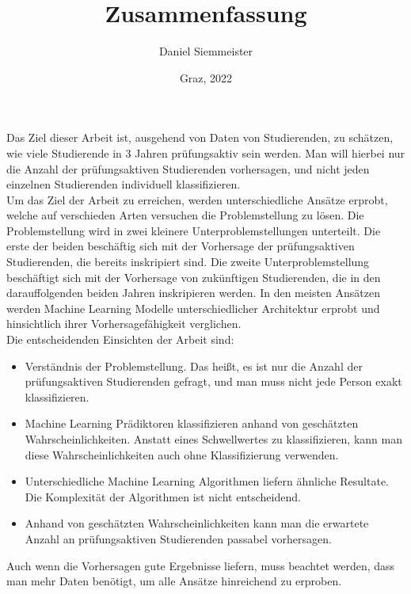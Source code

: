 \documentclass[a4paper, german, 11pt]{article}
\title{Zusammenfassung}
\author{Daniel Siemmeister}
\date{Graz, 2022}
\begin{document}
\maketitle
\thispagestyle{empty}

Das Ziel dieser Arbeit ist, ausgehend von Daten von Studierenden, zu sch\"atzen, wie viele
Studierende in 3 Jahren pr\"ufungsaktiv sein werden. Man will hierbei nur die Anzahl der pr\"ufungsaktiven Studierenden vorhersagen,
und nicht jeden einzelnen Studierenden individuell klassifizieren. \\

Um das Ziel der Arbeit zu erreichen, werden unterschiedliche Ans\"atze erprobt, welche auf verschieden Arten versuchen die Problemstellung zu l\"osen.
Die Problemstellung wird in zwei kleinere Unterproblemstellungen unterteilt. Die erste der beiden besch\"aftig sich mit der Vorhersage der pr\"ufungsaktiven Studierenden,
die bereits inskripiert sind. Die zweite Unterproblemstellung besch\"aftigt sich mit der Vorhersage von zuk\"unftigen Studierenden, die in den darauffolgenden beiden Jahren inskripieren werden.
In den meisten Ans\"atzen werden Machine Learning Modelle unterschiedlicher Architektur erprobt und hinsichtlich ihrer Vorhersagef\"ahigkeit
verglichen. \\

Die entscheidenden Einsichten der Arbeit sind:
\begin{itemize}
    \item Verst\"andnis der Problemstellung. Das hei{\ss}t, es ist nur die Anzahl der pr\"ufungsaktiven Studierenden gefragt, und man muss nicht jede Person exakt klassifizieren.
    \item Machine Learning Pr\"adiktoren klassifizieren anhand von gesch\"atzten Wahrscheinlichkeiten. Anstatt eines Schwellwertes zu klassifizieren,
          kann man diese Wahrscheinlichkeiten auch ohne Klassifizierung verwenden.
    \item Unterschiedliche Machine Learning Algorithmen liefern \"ahnliche Resultate. Die Komplexit\"at der Algorithmen ist nicht entscheidend.
    \item Anhand von gesch\"atzten Wahrscheinlichkeiten kann man die erwartete Anzahl an pr\"ufungsaktiven Studierenden passabel vorhersagen.
\end{itemize}

Auch wenn die Vorhersagen gute Ergebnisse liefern, muss beachtet werden, dass man mehr Daten ben\"otigt, um alle Ans\"atze hinreichend zu erproben.
\end{document}

